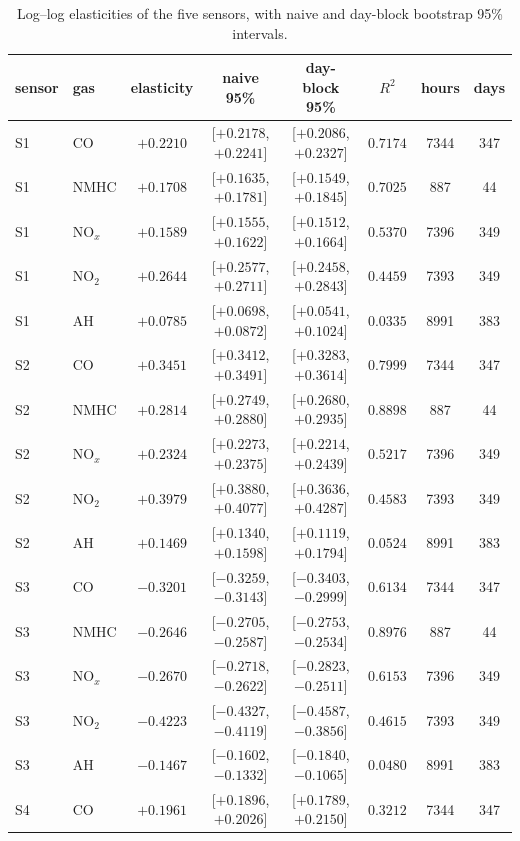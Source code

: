 \documentclass[11pt]{article}
\theoremstyle{definition}\newtheorem{definition}[theorem]{Definition}
\theoremstyle{remark}\newtheorem{remark}[theorem]{Remark}
\begin{document}
\begin{table}[htbp]\centering
\caption{Log--log elasticities of the five sensors, with naive and day-block bootstrap 95\% intervals.}\label{tab:elast}
\footnotesize
\begin{tabular}{@{}llcccccc@{}}\toprule
sensor & gas & elasticity & naive 95\% & day-block 95\% & $R^2$ & hours & days\\\midrule
S1 & CO & $+0.2210$ & [$+0.2178$, $+0.2241$] & [$+0.2086$, $+0.2327$] & $0.7174$ & 7344 & 347\\
S1 & NMHC & $+0.1708$ & [$+0.1635$, $+0.1781$] & [$+0.1549$, $+0.1845$] & $0.7025$ & 887 & 44\\
S1 & NO$_x$ & $+0.1589$ & [$+0.1555$, $+0.1622$] & [$+0.1512$, $+0.1664$] & $0.5370$ & 7396 & 349\\
S1 & NO$_2$ & $+0.2644$ & [$+0.2577$, $+0.2711$] & [$+0.2458$, $+0.2843$] & $0.4459$ & 7393 & 349\\
S1 & AH & $+0.0785$ & [$+0.0698$, $+0.0872$] & [$+0.0541$, $+0.1024$] & $0.0335$ & 8991 & 383\\
S2 & CO & $+0.3451$ & [$+0.3412$, $+0.3491$] & [$+0.3283$, $+0.3614$] & $0.7999$ & 7344 & 347\\
S2 & NMHC & $+0.2814$ & [$+0.2749$, $+0.2880$] & [$+0.2680$, $+0.2935$] & $0.8898$ & 887 & 44\\
S2 & NO$_x$ & $+0.2324$ & [$+0.2273$, $+0.2375$] & [$+0.2214$, $+0.2439$] & $0.5217$ & 7396 & 349\\
S2 & NO$_2$ & $+0.3979$ & [$+0.3880$, $+0.4077$] & [$+0.3636$, $+0.4287$] & $0.4583$ & 7393 & 349\\
S2 & AH & $+0.1469$ & [$+0.1340$, $+0.1598$] & [$+0.1119$, $+0.1794$] & $0.0524$ & 8991 & 383\\
S3 & CO & $-0.3201$ & [$-0.3259$, $-0.3143$] & [$-0.3403$, $-0.2999$] & $0.6134$ & 7344 & 347\\
S3 & NMHC & $-0.2646$ & [$-0.2705$, $-0.2587$] & [$-0.2753$, $-0.2534$] & $0.8976$ & 887 & 44\\
S3 & NO$_x$ & $-0.2670$ & [$-0.2718$, $-0.2622$] & [$-0.2823$, $-0.2511$] & $0.6153$ & 7396 & 349\\
S3 & NO$_2$ & $-0.4223$ & [$-0.4327$, $-0.4119$] & [$-0.4587$, $-0.3856$] & $0.4615$ & 7393 & 349\\
S3 & AH & $-0.1467$ & [$-0.1602$, $-0.1332$] & [$-0.1840$, $-0.1065$] & $0.0480$ & 8991 & 383\\
S4 & CO & $+0.1961$ & [$+0.1896$, $+0.2026$] & [$+0.1789$, $+0.2150$] & $0.3212$ & 7344 & 347\\

\end{tabular}
\end{table}
\end{document}
